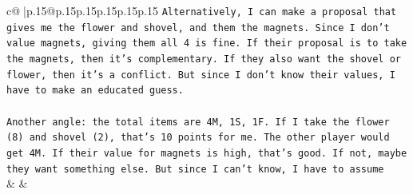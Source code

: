 \documentclass{article}
\begin{document}
{\begin{supertabular}{c@{$\;$}|p{.15\linewidth}@{}p{.15\linewidth}p{.15\linewidth}p{.15\linewidth}p{.15\linewidth}p{.15\linewidth}}
{{{\texttt{Alternatively, I can make a proposal that gives me the flower and shovel, and them the magnets. Since I don't value magnets, giving them all 4 is fine. If their proposal is to take the magnets, then it's complementary. If they also want the shovel or flower, then it's a conflict. But since I don't know their values, I have to make an educated guess. } \\
\\ 
\texttt{Another angle: the total items are 4M, 1S, 1F. If I take the flower (8) and shovel (2), that's 10 points for me. The other player would get 4M. If their value for magnets is high, that's good. If not, maybe they want something else. But since I can't know, I have to assume} \\
            }
        }
    }
    & & \\ \\


\end{supertabular}}
\end{document}

